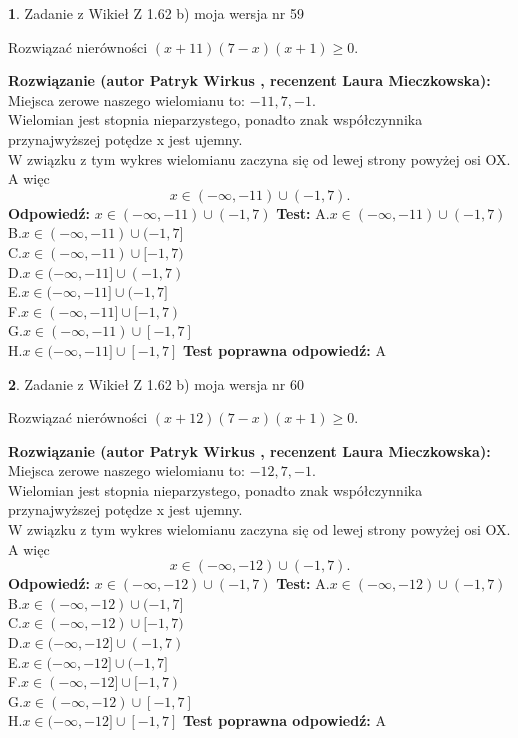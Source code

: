 \documentclass[12pt, a4paper]{article}
\theoremstyle{definition} %
\newtheorem{zad}{}
\newcommand{\zadStart}[1]{\begin{zad}#1\newline}
\newcommand{\zadStop}{\end{zad}}
\newcommand{\rozwStart}[2]{\noindent \textbf{Rozwiązanie (autor #1 , recenzent #2): }\newline}
\newcommand{\rozwStop}{\newline}
\newcommand{\odpStart}{\noindent \textbf{Odpowiedź:}\newline}
\newcommand{\odpStop}{\newline}
\newcommand{\testStart}{\noindent \textbf{Test:}\newline}
\newcommand{\testStop}{\newline}
\newcommand{\kluczStart}{\noindent \textbf{Test poprawna odpowiedź:}\newline}
\newcommand{\kluczStop}{\newline}
\begin{document}
\zadStart{Zadanie z Wikieł Z 1.62 b) moja wersja nr 59}

Rozwiązać nierówności $(x+11)(7-x)(x+1)\ge0$.
\zadStop
\rozwStart{Patryk Wirkus}{Laura Mieczkowska}
Miejsca zerowe naszego wielomianu to: $-11, 7, -1$.\\
Wielomian jest stopnia nieparzystego, ponadto znak współczynnika przy\linebreak najwyższej potędze x jest ujemny.\\ W związku z tym wykres wielomianu zaczyna się od lewej strony powyżej osi OX. A więc $$x \in (-\infty,-11) \cup (-1,7).$$
\rozwStop
\odpStart
$x \in (-\infty,-11) \cup (-1,7)$
\odpStop
\testStart
A.$x \in (-\infty,-11) \cup (-1,7)$\\
B.$x \in (-\infty,-11) \cup (-1,7]$\\
C.$x \in (-\infty,-11) \cup [-1,7)$\\
D.$x \in (-\infty,-11] \cup (-1,7)$\\
E.$x \in (-\infty,-11] \cup (-1,7]$\\
F.$x \in (-\infty,-11] \cup [-1,7)$\\
G.$x \in (-\infty,-11) \cup [-1,7]$\\
H.$x \in (-\infty,-11] \cup [-1,7]$
\testStop
\kluczStart
A
\kluczStop



\zadStart{Zadanie z Wikieł Z 1.62 b) moja wersja nr 60}

Rozwiązać nierówności $(x+12)(7-x)(x+1)\ge0$.
\zadStop
\rozwStart{Patryk Wirkus}{Laura Mieczkowska}
Miejsca zerowe naszego wielomianu to: $-12, 7, -1$.\\
Wielomian jest stopnia nieparzystego, ponadto znak współczynnika przy\linebreak najwyższej potędze x jest ujemny.\\ W związku z tym wykres wielomianu zaczyna się od lewej strony powyżej osi OX. A więc $$x \in (-\infty,-12) \cup (-1,7).$$
\rozwStop
\odpStart
$x \in (-\infty,-12) \cup (-1,7)$
\odpStop
\testStart
A.$x \in (-\infty,-12) \cup (-1,7)$\\
B.$x \in (-\infty,-12) \cup (-1,7]$\\
C.$x \in (-\infty,-12) \cup [-1,7)$\\
D.$x \in (-\infty,-12] \cup (-1,7)$\\
E.$x \in (-\infty,-12] \cup (-1,7]$\\
F.$x \in (-\infty,-12] \cup [-1,7)$\\
G.$x \in (-\infty,-12) \cup [-1,7]$\\
H.$x \in (-\infty,-12] \cup [-1,7]$
\testStop
\kluczStart
A
\kluczStop
\end{document}
